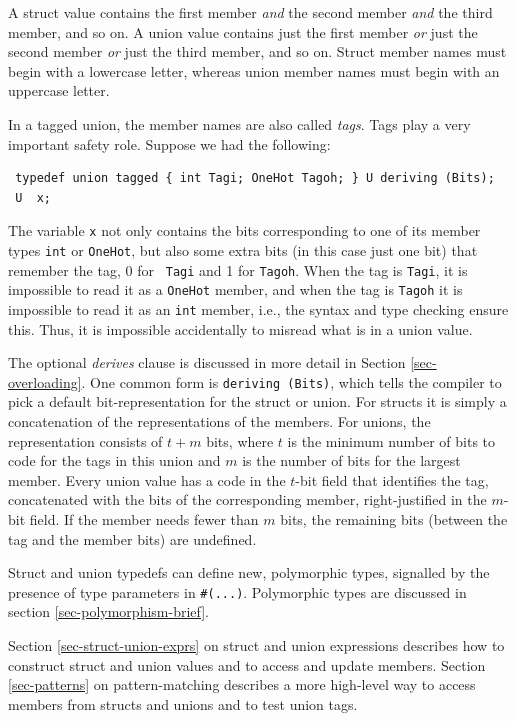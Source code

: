 \documentclass[twoside,letterpaper]{article}
\newcommand{\nterm}[1]{\emph{#1}}
\begin{document}
A struct value contains the first member \emph{and} the second member
\emph{and} the third member, and so on.  A union value contains just
the first member \emph{or} just the second member \emph{or} just the
third member, and so on.  Struct member names must begin with a
lowercase letter, whereas union member names must begin with an
uppercase letter.

In a tagged union, the member names are also called \emph{tags}.  Tags
play a very important safety role.  Suppose we had the following:
\begin{verbatim}
 typedef union tagged { int Tagi; OneHot Tagoh; } U deriving (Bits);
 U  x;
\end{verbatim}
The variable \texttt{x} not only contains the bits corresponding to one
of its member types \texttt{int} or \texttt{OneHot}, but also some extra
bits (in this case just one bit) that remember the tag, 0 for {\tt
Tagi} and 1 for \texttt{Tagoh}.  When the tag is \texttt{Tagi}, it is
impossible to read it as a \texttt{OneHot} member, and when the tag is
\texttt{Tagoh} it is impossible to read it as an \texttt{int} member, i.e.,
the syntax and type checking ensure this.  Thus, it is impossible
accidentally to misread what is in a union value.

The optional \nterm{derives} clause is discussed in more detail in
Section \ref{sec-overloading}.  One common form is \texttt{deriving
(Bits)}, which tells the compiler to pick a default bit-representation
for the struct or union.  For structs it is simply a concatenation of
the representations of the members.  For unions, the representation
consists of $t+m$ bits, where $t$ is the minimum number of bits to
code for the tags in this union and $m$ is the number of bits for the
largest member.  Every union value has a code in the $t$-bit field
that identifies the tag, concatenated with the bits of the
corresponding member, right-justified in the $m$-bit field.  If the
member needs fewer than $m$ bits, the remaining bits (between the tag
and the member bits) are undefined.

Struct and union typedefs can define new, polymorphic types, signalled
by the presence of type parameters in \texttt{\#(...)}. Polymorphic
types are discussed in section \ref{sec-polymorphism-brief}.

Section \ref{sec-struct-union-exprs} on struct and union expressions
describes how to construct struct and union values and to access and
update members.  Section \ref{sec-patterns} on pattern-matching
describes a more high-level way to access members from structs and
unions and to test union tags.
\end{document}
